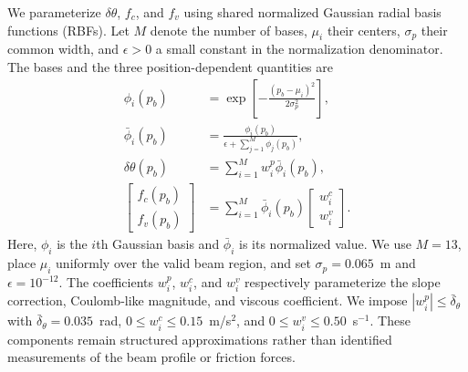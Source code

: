 \documentclass[letterpaper, 10 pt, conference]{ieeeconf}  %
\begin{document}
We parameterize $\delta\theta$, $f_c$, and $f_v$ using shared normalized Gaussian radial basis functions (RBFs).
Let $M$ denote the number of bases, $\mu_i$ their centers, $\sigma_p$ their common width, and $\epsilon>0$ a
small constant in the normalization denominator. The bases and the three position-dependent quantities are
\begin{equation}
\begin{aligned}
    \phi_i(p_b)
    &=\exp\!\left[-\frac{(p_b-\mu_i)^2}{2\sigma_p^2}\right],\\
    \bar\phi_i(p_b)
    &=\frac{\phi_i(p_b)}
    {\epsilon+\sum_{j=1}^{M}\phi_j(p_b)},\\
    \delta\theta(p_b)
    &=\sum_{i=1}^{M}w_i^p\bar\phi_i(p_b),\\
    \begin{bmatrix}f_c(p_b)\\ f_v(p_b)\end{bmatrix}
    &=\sum_{i=1}^{M}\bar\phi_i(p_b)
    \begin{bmatrix}w_i^c\\ w_i^v\end{bmatrix}.
\end{aligned}
    \label{eq:normalized_position_rbf}
\end{equation}
Here, $\phi_i$ is the $i$th Gaussian basis and $\bar\phi_i$ is its normalized value. We use $M=13$, place
$\mu_i$ uniformly over the valid beam region, and set $\sigma_p=0.065$~m and
$\epsilon=10^{-12}$. The coefficients $w_i^p$, $w_i^c$, and $w_i^v$ respectively parameterize the slope
correction, Coulomb-like magnitude, and viscous coefficient. We impose
$|w_i^p|\leq\bar\delta_\theta$ with $\bar\delta_\theta=0.035$~rad,
$0\leq w_i^c\leq0.15$~m/s$^2$, and $0\leq w_i^v\leq0.50$~s$^{-1}$. These components remain structured
approximations rather than identified measurements of the beam profile or friction forces.
\end{document}
